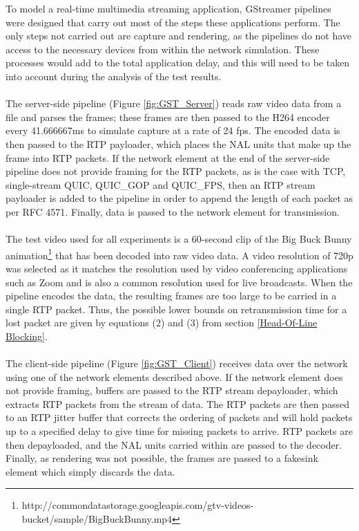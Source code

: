 \documentclass{mpaper}
\begin{document}
\noindent To model a real-time multimedia streaming application, \newline GStreamer pipelines were designed that carry out most of the steps these applications perform. The only steps not carried out are capture and rendering, as the pipelines do not have access to the necessary devices from within the network simulation. These processes would add to the total application delay, and this will need to be taken into account during the analysis of the test results.
\\\\
The server-side pipeline (Figure \ref{fig:GST_Server}) reads raw video data from a file and parses the frames; these frames are then passed to the H264 encoder every 41.666667ms to simulate capture at a rate of 24 fps. The encoded data is then passed to the RTP payloader, which places the NAL units that make up the frame into RTP packets. If the network element at the end of the server-side pipeline does not provide framing for the RTP packets, as is the case with TCP, single-stream QUIC, QUIC\_GOP and QUIC\_FPS, then an RTP stream payloader is added to the pipeline in order to append the length of each packet as per RFC 4571\cite{RFC4571}. Finally, data is passed to the network element for transmission. 
\\\\
The test video used for all experiments is a 60-second clip of the Big Buck Bunny animation\footnote{http://commondatastorage.googleapis.com/gtv-videos-bucket/sample/BigBuckBunny.mp4} that has been decoded into raw video data. A video resolution of 720p was selected as it matches the resolution used by video conferencing applications such as Zoom and is also a common resolution used for live broadcasts. When the pipeline encodes the data, the resulting frames are too large to be carried in a single RTP packet. Thus, the possible lower bounds on retransmission time for a lost packet are given by equations (2) and (3) from section \ref{Head-Of-Line Blocking}.
\\\\
The client-side pipeline (Figure \ref{fig:GST_Client}) receives data over the network using one of the network elements described above. If the network element does not provide framing, buffers are passed to the RTP stream depayloader, which extracts RTP packets from the stream of data. The RTP packets are then passed to an RTP jitter buffer that corrects the ordering of packets and will hold packets up to a specified delay to give time for missing packets to arrive. RTP packets are then depayloaded, and the NAL units carried within are passed to the decoder. Finally, as rendering was not possible, the frames are passed to a fakesink element which simply discards the data.
\end{document}
